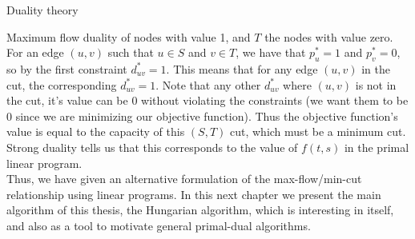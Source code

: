 \documentclass[11pt]{article}
\renewcommand{\'}{^{'}}
\begin{document}
\begin{section}{Duality theory}
\begin{subsection}{Maximum flow duality}
	of nodes with value 1, and $T$ the nodes with value zero. For an edge $(u,v)$ such that 
	$u\in S$ and $v\in T$, we have that $p_u^{*} = 1$ and $p_v^{*} = 0$, so by the first constraint 
	$d_{uv}^{*} = 1$. This means that for any edge $(u,v)$ in the cut, the corresponding 
	$d_{uv}^{*} = 1$. Note that any other $d_{uv}^{*}$ where $(u,v)$ is not in the cut, it's value 
	can be 0 without violating the constraints (we want them to be 0 since we are minimizing our 
	objective function). Thus the objective function's value is equal to the capacity of this 
	$(S,T)$ cut, which must be a minimum cut. Strong duality tells us that this corresponds to the 
	value of $f(t,s)$ in the primal linear program.\\
	Thus, we have given an alternative formulation of the max-flow/min-cut relationship using 
	linear programs. In this next chapter we present the main algorithm of this thesis, the 
	Hungarian algorithm, which is interesting in itself, and also as a tool to motivate general 
	primal-dual algorithms.
\end{subsection}
\end{section}
\end{document}
